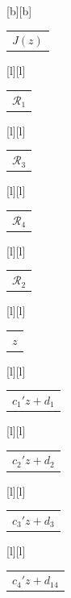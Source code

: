 %    
%
%
\begin{psfrags}%
\psfragscanon%
%
[b][b]{\color[rgb]{0,0,0}\setlength{\tabcolsep}{0pt}\begin{tabular}{c}$J(z)$\end{tabular}}%
[l][l]{\color[rgb]{0,0,0}\setlength{\tabcolsep}{0pt}\begin{tabular}{l}$\mathcal{R_1}$ \end{tabular}}%
[l][l]{\color[rgb]{0,0,0}\setlength{\tabcolsep}{0pt}\begin{tabular}{l}$\mathcal{R}_3$ \end{tabular}}%
[l][l]{\color[rgb]{0,0,0}\setlength{\tabcolsep}{0pt}\begin{tabular}{l}$\mathcal{R}_4$ \end{tabular}}%
[l][l]{\color[rgb]{0,0,0}\setlength{\tabcolsep}{0pt}\begin{tabular}{l}$\mathcal{R}_2$ \end{tabular}}%
[l][l]{\color[rgb]{0,0,0}\setlength{\tabcolsep}{0pt}\begin{tabular}{l}$z$ \end{tabular}}%
[l][l]{\color[rgb]{0,0,0}\setlength{\tabcolsep}{0pt}\begin{tabular}{l}$c_1'z+d_1$ \end{tabular}}%
[l][l]{\color[rgb]{0,0,0}\setlength{\tabcolsep}{0pt}\begin{tabular}{l}$c_2'z+d_2$ \end{tabular}}%
[l][l]{\color[rgb]{0,0,0}\setlength{\tabcolsep}{0pt}\begin{tabular}{l}$c_3'z+d_3$ \end{tabular}}%
[l][l]{\color[rgb]{0,0,0}\setlength{\tabcolsep}{0pt}\begin{tabular}{l}$c_4'z+d_14$ \end{tabular}}%
%

\end{psfrags}
